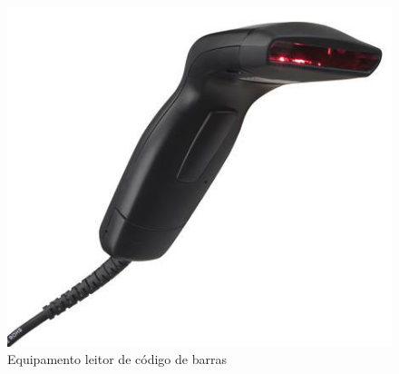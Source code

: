 \begin{figure}[!h]
\centering
\includegraphics[scale=0.65, angle = 360]{figuras/lala5}
\caption[]{Equipamento leitor de código de barras}
\end{figure}
\FloatBarrier
